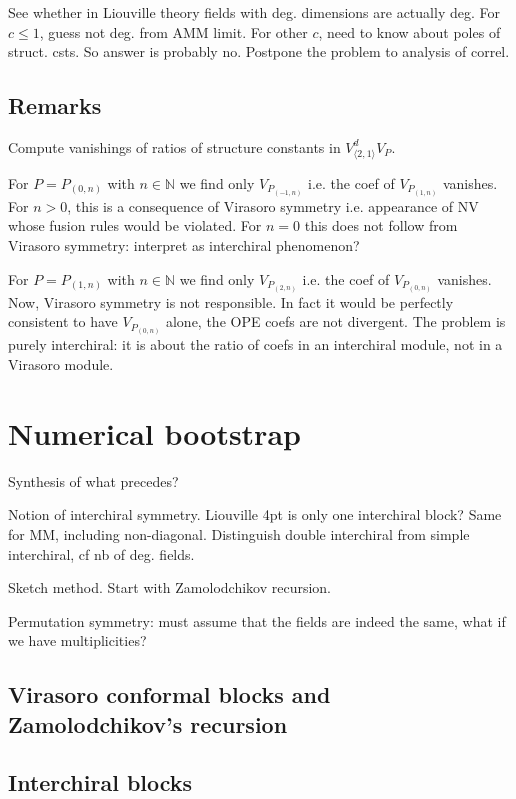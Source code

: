 \documentclass[12pt, a4paper]{article}
\theoremstyle{break}
\begin{document}
See whether in Liouville theory fields with deg. dimensions are actually deg. For $c\leq 1$, guess not deg. from AMM limit. For other $c$, need to know about poles of struct. csts. So answer is probably no. Postpone the problem to analysis of correl. 

\subsection{Remarks}

Compute vanishings of ratios of structure constants in $V^d_{\langle 2,1\rangle}V_P$. 

For $P=P_{(0,n)}$ with $n\in\mathbb{N}$ we find only $V_{P_{(-1,n)}}$ i.e. the coef of $V_{P_{(1,n)}}$ vanishes. For $n>0$, this is a consequence of Virasoro symmetry i.e. appearance of NV whose fusion rules would be violated. For $n=0$ this does not follow from Virasoro symmetry: interpret as interchiral phenomenon?

For $P=P_{(1,n)}$ with $n\in\mathbb{N}$ we find only $V_{P_{(2,n)}}$ i.e. the coef of $V_{P_{(0,n)}}$ vanishes. Now, Virasoro symmetry is not responsible. In fact it would be perfectly consistent to have $V_{P_{(0,n)}}$ alone, the OPE coefs are not divergent. The problem is purely interchiral: it is about the ratio of coefs in an interchiral module, not in a Virasoro module. 

\section{Numerical bootstrap}

Synthesis of what precedes?

Notion of interchiral symmetry. Liouville 4pt is only one interchiral block? Same for MM, including non-diagonal. Distinguish double interchiral from simple interchiral, cf nb of deg. fields. 

Sketch method. Start with Zamolodchikov recursion.

Permutation symmetry: must assume that the fields are indeed the same, what if we have multiplicities? 

\subsection{Virasoro conformal blocks and Zamolodchikov's recursion}

\subsection{Interchiral blocks} \label{sec:icb}
\end{document}
